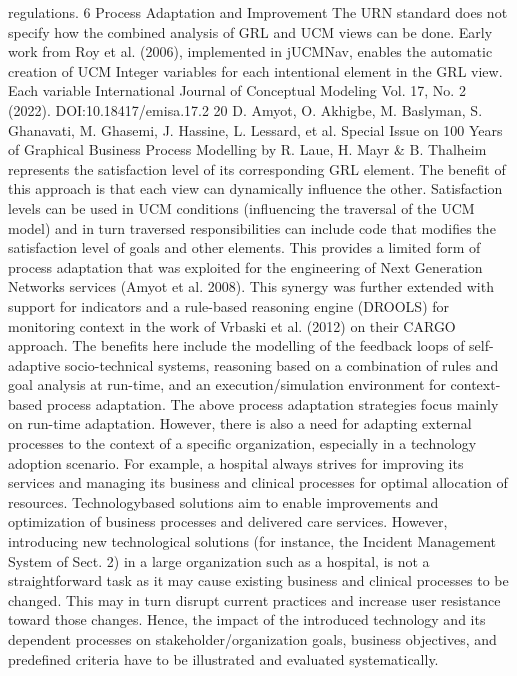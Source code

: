 regulations.
6 Process Adaptation and Improvement
The URN standard does not specify how the combined analysis of GRL and UCM views can be
done. Early work from Roy et al. (2006), implemented in jUCMNav, enables the automatic
creation of UCM Integer variables for each intentional element in the GRL view. Each variable
International Journal of Conceptual Modeling
Vol. 17, No. 2 (2022). DOI:10.18417/emisa.17.2
20 D. Amyot, O. Akhigbe, M. Baslyman, S. Ghanavati, M. Ghasemi, J. Hassine, L. Lessard, et al.
Special Issue on 100 Years of Graphical Business Process Modelling by R. Laue, H. Mayr & B. Thalheim
represents the satisfaction level of its corresponding GRL element. The benefit of this approach
is that each view can dynamically influence the
other. Satisfaction levels can be used in UCM
conditions (influencing the traversal of the UCM
model) and in turn traversed responsibilities can
include code that modifies the satisfaction level of
goals and other elements. This provides a limited
form of process adaptation that was exploited
for the engineering of Next Generation Networks
services (Amyot et al. 2008).
This synergy was further extended with support
for indicators and a rule-based reasoning engine
(DROOLS) for monitoring context in the work of
Vrbaski et al. (2012) on their CARGO approach.
The benefits here include the modelling of the
feedback loops of self-adaptive socio-technical
systems, reasoning based on a combination of
rules and goal analysis at run-time, and an execution/simulation environment for context-based
process adaptation.
The above process adaptation strategies focus
mainly on run-time adaptation. However, there
is also a need for adapting external processes to
the context of a specific organization, especially
in a technology adoption scenario. For example, a
hospital always strives for improving its services
and managing its business and clinical processes
for optimal allocation of resources. Technologybased solutions aim to enable improvements and
optimization of business processes and delivered
care services. However, introducing new technological solutions (for instance, the Incident Management System of Sect. 2) in a large organization
such as a hospital, is not a straightforward task
as it may cause existing business and clinical
processes to be changed. This may in turn disrupt current practices and increase user resistance
toward those changes. Hence, the impact of the introduced technology and its dependent processes
on stakeholder/organization goals, business objectives, and predefined criteria have to be illustrated
and evaluated systematically.
